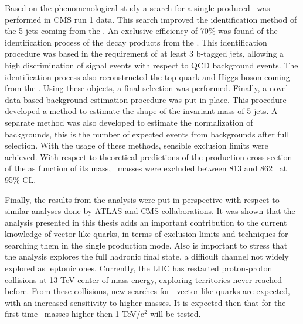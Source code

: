 Based on the phenomenological study a search for a single produced \Tp~was performed in CMS run 1 data. This search improved the identification method of the 5 jets coming from the \Tp. An exclusive efficiency of 70\% was found of the identification process of the decay products from the \Tp. This identification procedure was based in the requirement of at least 3 b-tagged jets, allowing a high discrimination of signal events with respect to QCD background events. The identification process also reconstructed the top quark and Higgs boson coming from the \Tp. Using these objects, a final selection was performed. Finally, a novel data-based background estimation procedure was put in place. This procedure developed a method to estimate the shape of the invariant mass of 5 jets. A separate method was also developed to estimate the normalization of backgrounds, this is the number of expected events from backgrounds after full selection. With the usage of these methods, sensible exclusion limits were achieved. With respect to theoretical predictions of the production cross section of the \Tp as function of its mass, \Tp~masses were excluded between 813 and 862 \GeVcc~at 95\% CL.

Finally, the results from the analysis were put in perspective with respect to similar analyses done by ATLAS and CMS collaborations. It was shown that the analysis presented in this thesis adds an important contribution to the current knowledge of vector like quarks, in terms of exclusion limits and techniques for searching them in the single production mode. Also is important to stress that the analysis explores the full hadronic final state, a difficult channel not widely explored as leptonic ones. Currently, the LHC has restarted proton-proton collisions at 13 TeV center of mass energy, exploring territories never reached before. From these collisions, new searches for \Tp~vector like quarks are expected, with an increased sensitivity to higher masses. It is expected then that for the first time \Tp~masses higher then 1 TeV/$\text{c}^{2}$ will be tested.